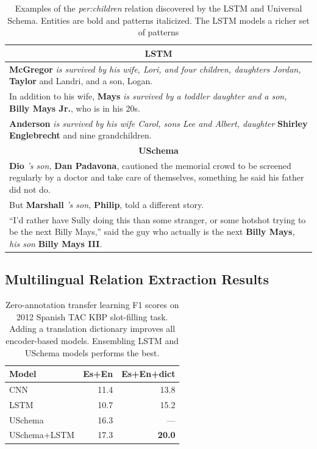 \begin{table}[h]
\begin{center}
\small
\begin{tabular}{|p{7.6cm}|}
\hline
\multicolumn{1}{|c|}{\textbf{LSTM}} \\ \hline
{\bf McGregor} \emph{is survived by his wife, Lori, and four children, daughters Jordan,} { \bf Taylor} and Landri, and a son, Logan. \\ \hline
In addition to his wife, {\bf Mays} \emph{is survived by a toddler daughter and a son,} {\bf Billy Mays Jr.}, who is in his 20s. \\ \hline
{\bf Anderson} \emph{is survived by his wife Carol, sons Lee and Albert, daughter} {\bf Shirley Englebrecht} and nine grandchildren. \\
\hline\hline
\multicolumn{1}{|c|}{\textbf{USchema}}  \\ \hline
{\bf Dio} \emph{'s son,} {\bf Dan Padavona}, cautioned the memorial crowd to be screened regularly by a doctor and take care of themselves, something he said his father did not do. \\ \hline
But {\bf Marshall} \emph{'s son,} {\bf Philip}, told a different story.  \\ \hline
``I'd rather have Sully doing this than some stranger, or some hotshot trying to
be the next Billy Mays,'' said the guy who actually is the next {\bf Billy Mays}\emph{, his son} {\bf Billy Mays III}. \\
\hline
\end{tabular}
\caption{Examples of the \emph{per:children} relation discovered by the LSTM and Universal Schema. Entities are bold and patterns italicized. The LSTM models a richer set of patterns \label{tab:lstm-us-similar-rels}}
\end{center}
\end{table}




\subsection{Multilingual Relation Extraction Results \label{sec:qual-anal}}

\begin{table}
\begin{center}
\begin{tabular}{|lrr|}
\hline
\bf Model & \bf Es+En & \bf Es+En+dict  \\
\hline\hline
CNN 		                    & 11.4     & 13.8	\\
LSTM 	                        & 10.7     & 15.2   \\
USchema                         & 16.3     & --- \\
\hline
USchema+LSTM                    & 17.3     & \bf 20.0 \\
\hline
\end{tabular}
\caption{Zero-annotation transfer learning F1 scores on 2012 Spanish TAC KBP slot-filling task. Adding a translation dictionary improves all encoder-based models. Ensembling LSTM and USchema models performs the best. \label{es-tac-table}}
\end{center}
\end{table}

